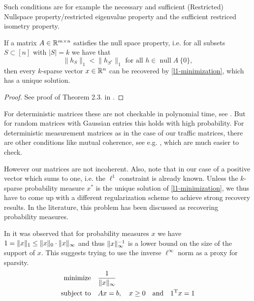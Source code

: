 \documentclass{article} %
\renewcommand{\null}{\operatorname{null}}
\begin{document}
Such conditions are for example the necessary and sufficient (Restricted) Nullspace property/restricted eigenvalue property and the sufficient restriced isometry property. 
\begin{theorem}
If a matrix $A \in \mathbb{R}^{m\times n}$ satisfies the null space property, i.e. for all subsets $S \subset [n]$ with $|S| = k$ we have that
\begin{equation*}
\|h_S\|_1 < \|h_{S^c}\|_1 \text{ for all } h\in\null A \ \{0\},
\end{equation*}
then every $k$-sparse vector $x \in \mathbb{R}^n$ can be recovered by \eqref{l1-minimization}, which has a unique solution.
\end{theorem}
\begin{proof}
See proof of Theorem 2.3. in \cite{Rauhut}.
\end{proof}

For deterministic matrices these are not checkable in polynomial time, see \cite{DonohoCheckable}. But for random matrices with Gaussian entries this holds with high probability. For deterministic measurement matrices as in the case of our traffic matrices, there are other conditions like mutual coherence, see e.g. \cite{Fuchs}, which are much easier to check.

\begin{theorem}[Incoherence]

\end{theorem}

However our matrices are not incoherent. Also, note that in our case of a positive vector which sums to one, i.e. the $\ell^1$ constraint is already known. Unless the $k$-sparse probability measure $x^*$ is the unique solution of \eqref{l1-minimization}, we thus have to come up with a different regularization scheme to achieve strong recovery results. In the literature, this problem has been discussed as recovering probability measures. 

In \cite{mert} it was observed that for probability measures $x$ we have $1 = \lVert x\rVert_1 \leq \lVert x\rVert_0\cdot \lVert x\rVert_\infty$ and thus $\lVert x\rVert_{\infty}^{-1}$ is a lower bound on the size of the support of $x$. This suggests trying to use the inverse $\ell^\infty$ norm as a proxy for sparsity.
\begin{equation}\label{l8-minimization}
  \begin{split}
    \text{minimize} &\quad \frac{1}{\lVert x\rVert_\infty}\\
    \text{subject to} &\quad Ax = b,\quad x\geq 0\quad\text{and}\quad 1^{\rm T} x = 1
  \end{split}
\end{equation}
\end{document}
